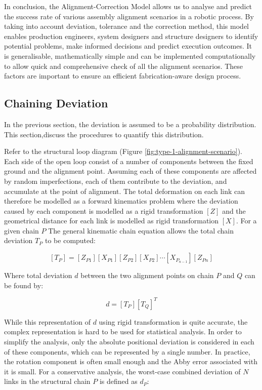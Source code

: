 In conclusion, the Alignment-Correction Model allows us to analyse and predict the success rate of various assembly alignment scenarios in a robotic process. By taking into account deviation, tolerance and the correction method, this model enables production engineers, system designers and structure designers to identify potential problems, make informed decisions and predict execution outcomes. It is generalisable, mathematically simple and can be implemented computationally to allow quick and comprehensive check of all the alignment scenarios. These factors are important to ensure an efficient fabrication-aware design process.

\subsection{Chaining Deviation}
\label{subsection:new-hypo-model-chaining-deviation}

In the previous section, the deviation is assumed to be a probability distribution. This section,discuss the procedures to quantify this distribution. 

Refer to the structural loop diagram (Figure \ref{fig:type-1-alignment-scenario}). Each side of the open loop consist of a number of components between the fixed ground and the alignment point. Assuming each of these components are affected by random imperfections, each of them contribute to the deviation, and accumulate at the point of alignment. The total deformation on each link can therefore be modelled as a forward kinematics problem where the deviation caused by each component is modelled as a rigid transformation $[Z]$ and the geometrical distance for each link is modelled as rigid transformation $[X]$. For a given chain $P$ The general kinematic chain equation allows the total chain deviation $T_P$ to be computed:

\begin{equation} \label{eq:one-chain-deviation}
    [T_P] = [Z_{P1}][X_{P1}][Z_{P2}][X_{P2}] \cdots [X_{P_{n-1}}][Z_{Pn}] 
\end{equation}

Where total deviation $d$ between the two alignment points on chain $P$ and $Q$ can be found by:

\begin{equation} \label{eq:two-chain-deviation}
    d = [T_P][T_Q]^T 
\end{equation}

While this representation of $d$ using rigid transformation is quite accurate, the complex representation is hard to be used for statistical analysis. In order to simplify the analysis, only the absolute positional deviation is considered in each of these components, which can be represented by a single number. In practice, the rotation component is often small enough and the Abby error associated with it is small. For a conservative analysis, the worst-case combined deviation of $N$ links in the structural chain $P$ is defined as $d_P$:

